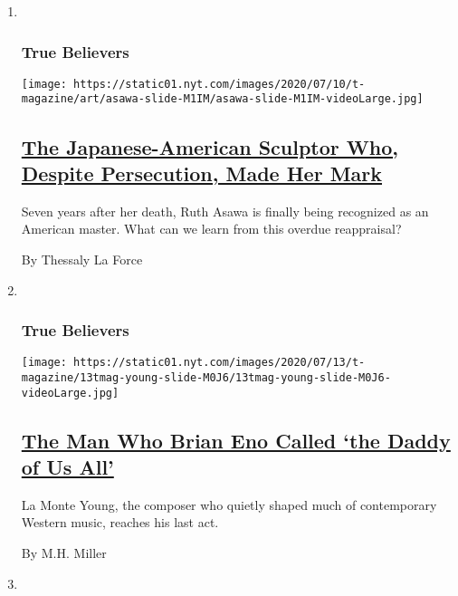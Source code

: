 \begin{enumerate}
\def\labelenumi{\arabic{enumi}.}
\item ~
  \hypertarget{true-believers-1}{%
  \subsubsection{True Believers}\label{true-believers-1}}

  \texttt{[image: https://static01.nyt.com/images/2020/07/10/t-magazine/art/asawa-slide-M1IM/asawa-slide-M1IM-videoLarge.jpg]}

  \hypertarget{the-japanese-american-sculptor-who-despite-persecution-made-her-mark}{%
  \subsection{\texorpdfstring{\href{/2020/07/20/t-magazine/ruth-asawa.html}{The
  Japanese-American Sculptor Who, Despite Persecution, Made Her
  Mark}}{The Japanese-American Sculptor Who, Despite Persecution, Made Her Mark}}\label{the-japanese-american-sculptor-who-despite-persecution-made-her-mark}}

  Seven years after her death, Ruth Asawa is finally being recognized as
  an American master. What can we learn from this overdue reappraisal?

  By Thessaly La Force
\item ~
  \hypertarget{true-believers-2}{%
  \subsubsection{True Believers}\label{true-believers-2}}

  \texttt{[image: https://static01.nyt.com/images/2020/07/13/t-magazine/13tmag-young-slide-M0J6/13tmag-young-slide-M0J6-videoLarge.jpg]}

  \hypertarget{the-man-who-brian-eno-called-the-daddy-of-us-all}{%
  \subsection{\texorpdfstring{\href{/2020/07/22/t-magazine/la-monte-young.html}{The
  Man Who Brian Eno Called `the Daddy of Us
  All'}}{The Man Who Brian Eno Called `the Daddy of Us All'}}\label{the-man-who-brian-eno-called-the-daddy-of-us-all}}

  La Monte Young, the composer who quietly shaped much of contemporary
  Western music, reaches his last act.

  By M.H. Miller
\item ~
  \hypertarget{true-believers-3}{%
}
\end{enumerate}

